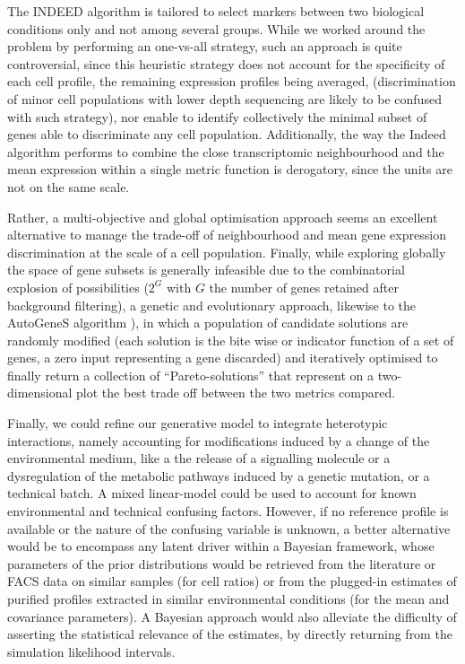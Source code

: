 \documentclass[long, final]{jobim}
\begin{document}
The INDEED algorithm \cite{zuo_etal16} is tailored to select markers between two biological conditions only and not among several groups. While we worked around the problem by performing an one-vs-all strategy, such an approach is quite controversial, since this heuristic strategy does not account for the specificity of each cell profile, the remaining expression profiles being averaged, (discrimination of minor cell populations with lower depth sequencing are likely to be confused with such strategy), nor enable to identify collectively the minimal subset of genes able to discriminate any cell population. Additionally, the way the Indeed algorithm performs to combine the close transcriptomic neighbourhood and the mean expression within a single metric function is derogatory, since the units are not on the same scale. 

Rather, a multi-objective and global optimisation approach seems an excellent alternative to manage the trade-off of neighbourhood and mean gene expression discrimination at the scale of a cell population. Finally, while exploring globally the space of gene subsets is generally infeasible due to the combinatorial explosion of possibilities ($2^G$ with $G$ the number of genes retained after background filtering), a genetic and evolutionary approach, likewise to the AutoGeneS algorithm \cite{aliee_theis21}), in which a population of candidate solutions are randomly modified (each solution is the bite wise or indicator function of a set of genes, a zero input representing a gene discarded) and iteratively optimised to finally return a collection of \enquote{Pareto-solutions} that represent on a two-dimensional plot the best trade off between the two metrics compared. 


Finally, we could refine our generative model to integrate heterotypic interactions, namely accounting for modifications induced by a change of the environmental medium, like a the release of a signalling molecule or a dysregulation of the metabolic pathways induced by a genetic mutation, or a technical batch. A mixed linear-model could be used to account for known environmental and technical confusing factors. However, if no reference profile is available or the nature of the confusing variable is unknown, a better alternative would be to encompass any latent driver within a Bayesian framework, whose parameters of the prior distributions would be retrieved from the literature or FACS data on similar samples (for cell ratios) or from the plugged-in estimates of purified profiles extracted in similar environmental conditions (for the mean and covariance parameters). A Bayesian approach would also alleviate the difficulty of asserting the statistical relevance of the estimates, by directly returning from the simulation likelihood intervals. 
\end{document}
